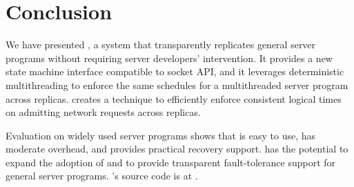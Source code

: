 \section{Conclusion} \label{sec:conclusion}
We have presented \xxx, a \smr system that 
transparently replicates general server programs without 
requiring server developers' intervention. It provides a new state machine 
interface compatible to socket API, and it leverages 
deterministic multithreading to enforce the same schedules for a multithreaded 
server program across replicas. \xxx creates a \timealgo technique to 
efficiently enforce consistent logical times on admitting network requests 
across replicas.

Evaluation on \nprog widely used server programs shows that 
\xxx is easy to use, has moderate overhead, and provides practical recovery 
support. \xxx has the potential to expand the adoption of \smr and to provide 
transparent fault-tolerance support for general server programs. \xxx's 
source code is at \github.



% 
